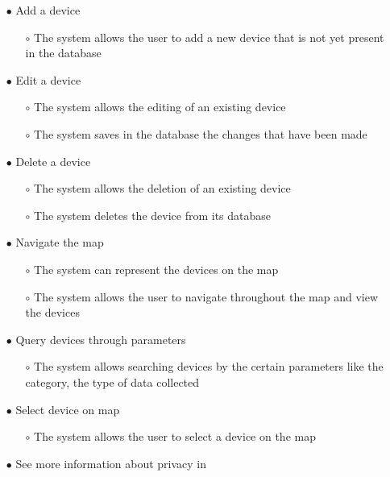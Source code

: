 \begin{itemize}
    \item[$\bullet$] Add a device
        \begin{itemize}
            \item[$\circ$] The system allows the user to add a new device that is not yet present in the database
        \end{itemize}
    \item[$\bullet$] Edit a device
    \begin{itemize}
        \item[$\circ$] The system allows the editing of an existing device
        \item[$\circ$] The system saves in the database the changes that have been made
    \end{itemize}
    \item[$\bullet$] Delete a device
    \begin{itemize}
        \item[$\circ$] The system allows the deletion of an existing device
        \item[$\circ$] The system deletes the device from its database
    \end{itemize}
    \item[$\bullet$] Navigate the map
    \begin{itemize}
        \item[$\circ$] The system can represent the devices on the map
        \item[$\circ$] The system allows the user to navigate throughout the map and view the devices
    \end{itemize}
    \item[$\bullet$] Query devices through parameters
    \begin{itemize}
        \item[$\circ$] The system allows searching devices by the certain parameters like the category, the type of data collected
    \end{itemize}
    \item[$\bullet$] Select device on map
    \begin{itemize}
        \item[$\circ$] The system allows the user to select a device on the map
    \end{itemize}
    \item[$\bullet$] See more information about privacy in \hyperlink{\acronym}{\acronym}
    \begin{itemize}

\end{itemize}
\end{itemize}
